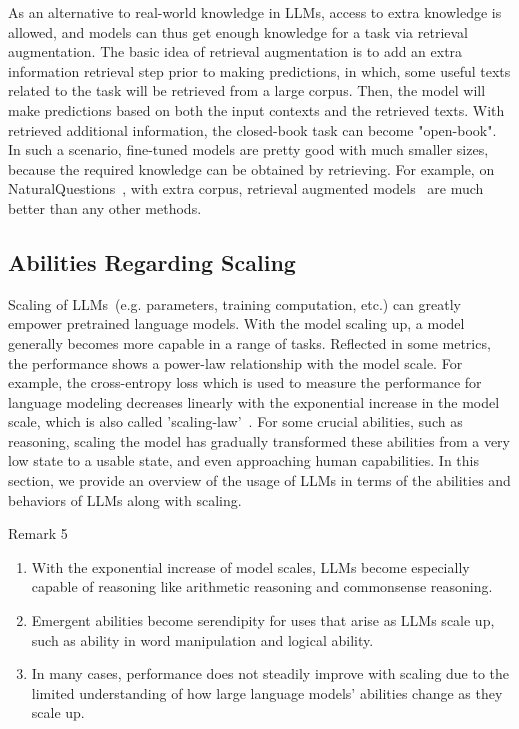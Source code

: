 \documentclass[manuscript,screen, nonacm]{acmart}
\begin{document}
As an alternative to real-world knowledge in LLMs, access to extra knowledge is allowed, and models can thus get enough knowledge for a task via retrieval augmentation. The basic idea of retrieval augmentation is to add an extra information retrieval step prior to making predictions, in which, some useful texts related to the task will be retrieved from a large corpus. Then, the model will make predictions based on both the input contexts and the retrieved texts. With retrieved additional information, the closed-book task can become "open-book". In such a scenario, fine-tuned models are pretty good with much smaller sizes, because the required knowledge can be obtained by retrieving. For example, on NaturalQuestions~\cite{kwiatkowski2019natural}, with extra corpus, retrieval augmented models~\cite{kedia2022fie, izacard_few-shot_2022} are much better than any other methods.  





\subsection{Abilities Regarding Scaling}

Scaling of LLMs~(e.g. parameters, training computation, etc.) can greatly empower pretrained language models. With the model scaling up, a model generally becomes more capable in a range of tasks. Reflected in some metrics, the performance shows a power-law relationship with the model scale. For example, the cross-entropy loss which is used to measure the performance for language modeling decreases linearly with the exponential increase in the model scale, which is also called 'scaling-law'~\cite{kaplan2020scaling, hoffmann2022training}. For some crucial abilities, such as reasoning, scaling the model has gradually transformed these abilities from a very low state to a usable state, and even approaching human capabilities. In this section, we provide an overview of the usage of LLMs in terms of the abilities and behaviors of LLMs along with scaling.

\begin{applebox}{Remark 5}
\begin{enumerate}[leftmargin=0.4cm]
\item With the exponential increase of model scales, LLMs become especially capable of reasoning like arithmetic reasoning and commonsense reasoning.
\item Emergent abilities become serendipity for uses that arise as LLMs scale up, such as ability in word manipulation and logical ability.
\item In many cases, performance does not steadily improve with scaling due to the limited understanding of how large language models' abilities change as they scale up.  
\end{enumerate}
\end{applebox}
\end{document}
